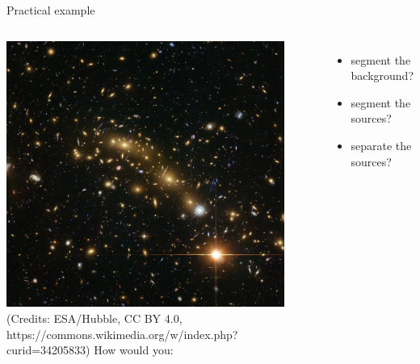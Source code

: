 \documentclass[xcolor=pdftex,dvipsnames,table,mathserif]{beamer}
\begin{document}

\begin{frame}{Practical example}
    \begin{columns}[c]
        \includegraphics[width=0.9\textwidth]{hst.jpg}\\
        {\tiny (Credits: ESA/Hubble, CC BY 4.0, https://commons.wikimedia.org/w/index.php?curid=34205833)}
      How would you:
      \begin{itemize}
      \item segment the background?
      \item segment the sources?
      \item separate the sources?
      \end{itemize}

    \end{columns}
\end{frame}


\end{document}
